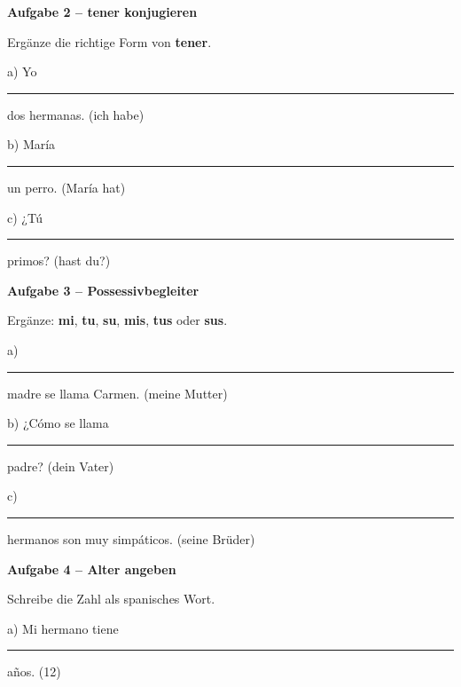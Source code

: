 \documentclass[11pt, a4paper]{article}
\newcommand{\fachfarbe}{spanisch}
\newcommand{\punktebox}[1]{\hfill\fbox{\small \_/#1}}
\newcommand{\luecke}[1]{\rule{#1}{0.4pt}}
\newenvironment{aufgabe}[1]{%
    \needspace{5\baselineskip}%
    \nopagebreak[4]%
    \vspace{10pt}
    \noindent\textbf{\textcolor{\fachfarbe}{Aufgabe #1}}
    \nopagebreak[4]%
    \vspace{5pt}
    \nopagebreak[4]%
    \begin{list}{}{\leftmargin=0pt}
    \item[]
}{%
    \end{list}
}
\newcommand{\es}[1]{\textcolor{\fachfarbe}{\textbf{#1}}}
\begin{document}

\begin{aufgabe}{2 -- tener konjugieren}
Ergänze die richtige Form von \es{tener}. \punktebox{6}
\end{aufgabe}

\noindent
a) Yo \luecke{2.5cm} dos hermanas. \hfill (ich habe)

\vspace{0.8em}

\noindent
b) María \luecke{2.5cm} un perro. \hfill (María hat)

\vspace{0.8em}

\noindent
c) ¿Tú \luecke{2.5cm} primos? \hfill (hast du?)

\vspace{15pt}


\begin{aufgabe}{3 -- Possessivbegleiter}
Ergänze: \es{mi}, \es{tu}, \es{su}, \es{mis}, \es{tus} oder \es{sus}. \punktebox{6}
\end{aufgabe}

\noindent
a) \luecke{2cm} madre se llama Carmen. \hfill (meine Mutter)

\vspace{0.8em}

\noindent
b) ¿Cómo se llama \luecke{2cm} padre? \hfill (dein Vater)

\vspace{0.8em}

\noindent
c) \luecke{2cm} hermanos son muy simpáticos. \hfill (seine Brüder)

\vspace{15pt}


\begin{aufgabe}{4 -- Alter angeben}
Schreibe die Zahl als spanisches Wort. \punktebox{6}
\end{aufgabe}

\noindent
a) Mi hermano tiene \luecke{3.5cm} años. \hfill (12)
\end{document}

